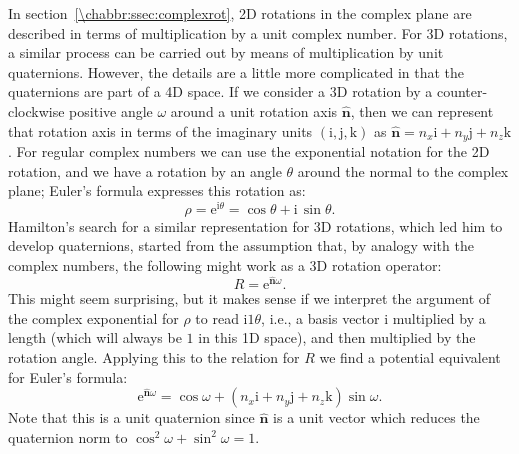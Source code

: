 In section~\ref{\chabbr:ssec:complexrot}, 2D rotations in the complex plane are described in terms of multiplication by a unit complex number.  For 3D rotations, a similar process can be carried out by means of multiplication by unit quaternions.  However, the details are a little more complicated in that the quaternions are part of a 4D space. If we consider a 3D rotation by a counter-clockwise positive angle $\omega$ around a unit rotation axis $\hat{\mathbf{n}}$, then we can represent that rotation axis in terms of the imaginary units $(\mathrm{i}, \mathrm{j}, \mathrm{k})$ as $\hat{\mathbf{n}}=n_x\mathrm{i}+n_y \mathrm{j}+n_z \mathrm{k}$.  For regular complex numbers we can use the exponential notation for the 2D rotation, and we have a rotation by an angle $\theta$ around the normal to the complex plane; Euler's formula expresses this rotation as:
\[
	\rho = \mathrm{e}^{\mathrm{i}\theta} = \cos\theta+\mathrm{i}\,\sin\theta.
\]
Hamilton's search for a similar representation for 3D rotations, which led him to develop quaternions, started from the assumption that, by analogy with the complex numbers, the following might work as a 3D rotation operator:
\[
	R = \mathrm{e}^{\hat{\mathbf{n}}\omega}.
\]
This might seem surprising, but it makes sense if we interpret the argument of the complex exponential for $\rho$ to read $\mathrm{i} 1 \theta$, i.e., a basis vector $\mathrm{i}$ multiplied by a length (which will always be $1$ in this 1D space), and then multiplied by the rotation angle.  Applying this to the relation for $R$ we find a potential equivalent for Euler's formula:
\[
	\mathrm{e}^{\hat{\mathbf{n}}\omega} = \cos\omega+ (n_x\mathrm{i}+n_y \mathrm{j}+n_z \mathrm{k})\sin\omega.
\]
Note that this is a unit quaternion since $\hat{\mathbf{n}}$ is a unit vector which reduces the quaternion norm to $\cos^2\omega+\sin^2\omega=1$.


